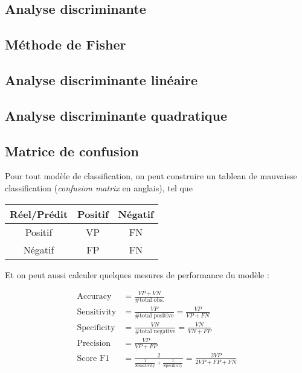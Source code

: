 \documentclass[10pt, french]{article}
\begin{document}
\begin{multicols*}{2}
\section{Analyse discriminante}

\subsection{Méthode de Fisher}

\subsection{Analyse discriminante linéaire}


\subsection{Analyse discriminante quadratique}


\subsection{Matrice de confusion}
Pour tout modèle de classification, on peut construire un tableau de mauvaisse classification (\textit{confusion matrix} en anglais), tel que

\begin{tabular}{|c|c|c|}
\hline
Réel/Prédit & Positif & Négatif \\
\hline
Positif & VP & FN \\
\hline
Négatif & FP & FN \\
\hline
\end{tabular}

Et on peut aussi calculer quelques mesures de performance du modèle : 

\begin{align*}
\text{Accuracy}	& = \frac{VP + VN}{\text{\# total obs.}} \\
\text{Sensitivity}	& = \frac{VP}{\text{\# total positive}} = \frac{VP}{VP + FN} \\
\text{Specificity}	& = \frac{VN}{\text{\# total negative}} = \frac{VN}{VN + FP} \\
\text{Precision} & = \frac{VP}{VP + FP} \\
\text{Score F1}	& = \frac{2}{\frac{1}{\text{Sensitivity}} + \frac{1}{\text{Specificity}}} = \frac{2 VP}{2 VP + FP + FN} \\
\end{align*}





\end{multicols*}
\end{document}
